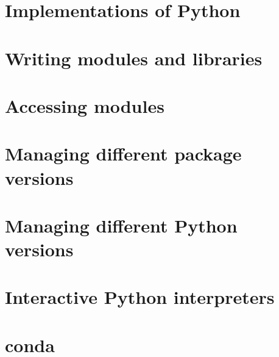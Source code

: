 \documentclass[oneside]{book}
\begin{document}
\part{Implementations of Python}


\part{Writing modules and libraries}



\part{Accessing modules}


\part{Managing different package versions}


\part{Managing different Python versions}


\part{Interactive Python interpreters}



\part{conda}

\end{document}
